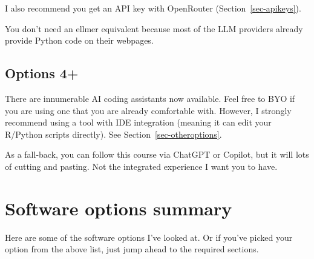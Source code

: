 \documentclass[
  letterpaper,
  DIV=11,
  numbers=noendperiod]{scrreprt}
\begin{document}
I also recommend you get an API key with OpenRouter
(Section~\ref{sec-apikeys}).

You don't need an ellmer equivalent because most of the LLM providers
already provide Python code on their webpages.

\subsection{Options 4+}\label{options-4}

There are innumerable AI coding assistants now available. Feel free to
BYO if you are using one that you are already comfortable with. However,
I strongly recommend using a tool with IDE integration (meaning it can
edit your R/Python scripts directly). See
Section~\ref{sec-otheroptions}.

As a fall-back, you can follow this course via ChatGPT or Copilot, but
it will lots of cutting and pasting. Not the integrated experience I
want you to have.

\section{Software options summary}\label{software-options-summary}

Here are some of the software options I've looked at. Or if you've
picked your option from the above list, just jump ahead to the required
sections.
\end{document}
